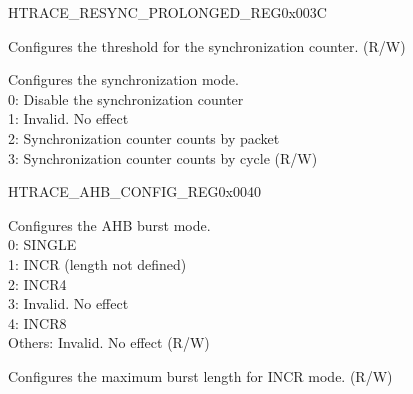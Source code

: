 \begin{register}{H}{TRACE\_RESYNC\_PROLONGED\_REG}{0x003C}\label{regdesc:TRACERESYNCPROLONGEDREG}
%
%
%
\regnewline%
\begin{regdesc}\begin{reglist}
\label{fielddesc:TRACERESYNCPROLONGED}\item [TRACE\_RESYNC\_PROLONGED] Configures the threshold for the synchronization counter. (R/W)
\label{fielddesc:TRACERESYNCMODE}\item [TRACE\_RESYNC\_MODE] Configures the synchronization mode.\\0: Disable the synchronization counter\\1: Invalid. No effect\\2: Synchronization counter counts by packet\\3: Synchronization counter counts by cycle (R/W)
\end{reglist}\end{regdesc}
\end{register}


\begin{register}{H}{TRACE\_AHB\_CONFIG\_REG}{0x0040}\label{regdesc:TRACEAHBCONFIGREG}
%
%
%
\regnewline%
\begin{regdesc}\begin{reglist}
\label{fielddesc:TRACEHBURST}\item [TRACE\_HBURST] Configures the AHB burst mode.\\0: SINGLE\\1: INCR (length not defined)\\2: INCR4\\3: Invalid. No effect\\4: INCR8\\Others: Invalid. No effect (R/W)
\label{fielddesc:TRACEMAXINCR}\item [TRACE\_MAX\_INCR] Configures the maximum burst length for INCR mode. (R/W)
\end{reglist}\end{regdesc}
\end{register}


